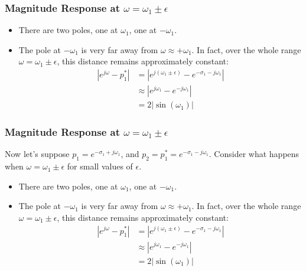     
\begin{frame}
  \frametitle{Magnitude Response at $\omega=\omega_1\pm\epsilon$}
  \begin{itemize}
  \item There are two poles, one at $\omega_1$, one at $-\omega_1$.
  \item The pole at $-\omega_1$ is very far away from $\omega\approx +\omega_1$.
    In fact, over the whole range $\omega=\omega_1\pm\epsilon$, this distance
    remains approximately constant:
    \begin{align*}
      |e^{j\omega}-p_1^*|&= |e^{j(\omega_1\pm\epsilon)}-e^{-\sigma_1-j\omega_1}|\\
      &\approx |e^{j\omega_1}-e^{-j\omega_1}|\\
      &= 2|\sin(\omega_1)|
    \end{align*}
  \end{itemize}
\end{frame}  

\begin{frame}
  \frametitle{Magnitude Response at $\omega=\omega_1\pm\epsilon$}

  Now let's suppose $p_1=e^{-\sigma_1+j\omega_1}$, and
  $p_2=p_1^*=e^{-\sigma_1-j\omega_1}$.  Consider what happens when
  $\omega=\omega_1\pm\epsilon$ for small values of $\epsilon$.
  \begin{itemize}
  \item There are two poles, one at $\omega_1$, one at $-\omega_1$.
  \item The pole at $-\omega_1$ is very far away from $\omega\approx +\omega_1$.
    In fact, over the whole range $\omega=\omega_1\pm\epsilon$, this distance
    remains approximately constant:
    \begin{align*}
      |e^{j\omega}-p_1^*|&= |e^{j(\omega_1\pm\epsilon)}-e^{-\sigma_1-j\omega_1}|\\
      &\approx |e^{j\omega_1}-e^{-j\omega_1}|\\
      &= 2|\sin(\omega_1)|
    \end{align*}
  \end{itemize}
\end{frame}  


